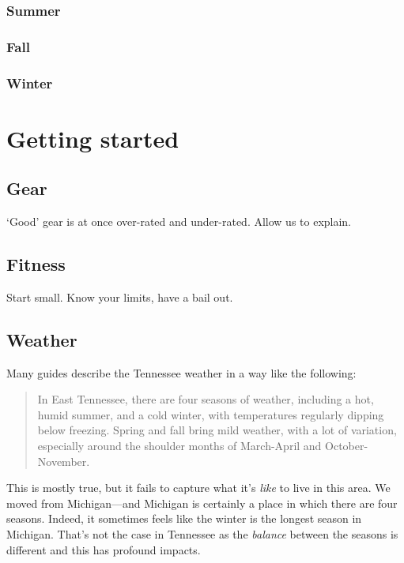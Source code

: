 \documentclass[
]{book}
\begin{document}
\hypertarget{summer}{%
\subsection{Summer}\label{summer}}

\hypertarget{fall}{%
\subsection{Fall}\label{fall}}

\hypertarget{winter}{%
\subsection{Winter}\label{winter}}

\hypertarget{getting-started}{%
\chapter{Getting started}\label{getting-started}}

\hypertarget{gear}{%
\section{Gear}\label{gear}}

`Good' gear is at once over-rated and under-rated. Allow us to explain.

\hypertarget{fitness}{%
\section{Fitness}\label{fitness}}

Start small. Know your limits, have a bail out.

\hypertarget{weather-1}{%
\section{Weather}\label{weather-1}}

Many guides describe the Tennessee weather in a way like the following:

\begin{quote}
In East Tennessee, there are four seasons of weather, including a hot, humid summer, and a cold winter, with temperatures regularly dipping below freezing. Spring and fall bring mild weather, with a lot of variation, especially around the shoulder months of March-April and October-November.
\end{quote}

This is mostly true, but it fails to capture what it's \emph{like} to live in this area. We moved from Michigan---and Michigan is certainly a place in which there are four seasons. Indeed, it sometimes feels like the winter is the longest season in Michigan. That's not the case in Tennessee as the \emph{balance} between the seasons is different and this has profound impacts.
\end{document}
